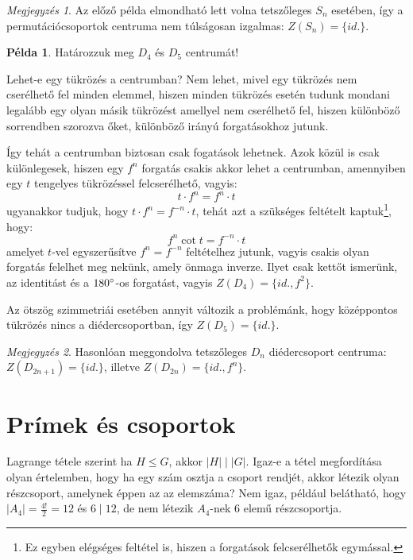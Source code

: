 \documentclass[12pt]{book}
\theoremstyle{plain} %
\theoremstyle{definition} %
\newtheorem{pl}{Példa}[section]
\theoremstyle{remark}
\newtheorem*{mj}{Megjegyzés}
\numberwithin{equation}{section}  %
\begin{document}
	\begin{mj}
		Az előző példa elmondható lett volna tetszőleges $S_n$ esetében, így a permutációcsoportok centruma nem túlságosan izgalmas: $Z(S_n) = \{id.\}$.
	\end{mj}

	\begin{pl}
		Határozzuk meg $D_4$ és $D_5$ centrumát!
		
		Lehet-e egy tükrözés a centrumban? Nem lehet, mivel egy tükrözés nem cserélhető fel minden elemmel, hiszen minden tükrözés esetén tudunk mondani legalább egy olyan másik tükrözést amellyel nem cserélhető fel, hiszen különböző sorrendben szorozva őket, különböző irányú forgatásokhoz jutunk.
		
		Így tehát a centrumban biztosan csak fogatások lehetnek. Azok közül is csak különlegesek, hiszen egy $f^n$ forgatás csakis akkor lehet a centrumban, amennyiben egy $t$ tengelyes tükrözéssel felcserélhető, vagyis:
		\[ t\cdot f^n = f^n \cdot t  \]
		ugyanakkor tudjuk, hogy $t\cdot f^n = f^{-n} \cdot t$, tehát azt a szükséges feltételt kaptuk\footnote{Ez egyben elégséges feltétel is, hiszen a forgatások felcserélhetők egymással.}, hogy:
		\[ f^n \cot t = f^{-n} \cdot t  \]
		amelyet $t$-vel egyszerűsítve $f^n = f^{-n}$ feltételhez jutunk, vagyis csakis olyan forgatás felelhet meg nekünk, amely önmaga inverze. Ilyet csak kettőt ismerünk, az identitást és a $180\degree$-os forgatást, vagyis $Z(D_4) = \{id., f^2\}$. %
		
		Az ötszög szimmetriái esetében annyit változik a problémánk, hogy középpontos tükrözés nincs a diédercsoportban, így $Z(D_5) = \{id.\}$.	\end{pl}
	
		\begin{mj}
			Hasonlóan meggondolva tetszőleges $D_n$ diédercsoport centruma: $Z(D_{2n+1}) = \{id.\} $, illetve $Z(D_{2n}) = \{id., f^n\}$.
		\end{mj}

	
	\section{Prímek és csoportok}
	
	Lagrange tétele szerint ha $H\leq G$, akkor $|H| \mid |G|$. Igaz-e a tétel megfordítása olyan értelemben, hogy ha egy szám osztja a csoport rendjét, akkor létezik olyan részcsoport, amelynek éppen az az elemszáma? Nem igaz, például belátható, hogy $|A_4|=\frac{4!}{2} = 12$ és $6\mid 12$, de nem létezik $A_4$-nek $6$ elemű részcsoportja.
	
\end{document}
